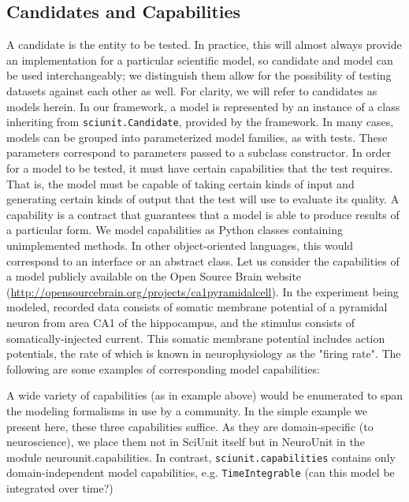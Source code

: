 \documentclass[a4paper,12pt]{article}
\begin{document}
\subsection{Candidates and Capabilities}
A candidate is the entity to be tested.  In practice, this will almost always provide an implementation for a particular scientific model, so candidate and model can be used interchangeably; we distinguish them allow for the possibility of testing datasets against each other as well.  For clarity, we will refer to candidates as models herein.  In our framework, a model is represented by an instance of a class inheriting from \verb|sciunit.Candidate|, provided by the framework.  In many cases, models can be grouped into parameterized model families, as with tests. These parameters correspond to parameters passed to a subclass constructor.
In order for a model to be tested, it must have certain capabilities that the test requires.  That is, the model must be capable of taking certain kinds of input and generating certain kinds of output that the test will use to evaluate its quality.  A capability is a contract that guarantees that a model is able to produce results of a particular form. We model capabilities as Python classes containing unimplemented methods. In other object-oriented languages, this would correspond to an interface or an abstract class.  
Let us consider the capabilities of a model publicly available on the Open Source Brain website (\url{http://opensourcebrain.org/projects/ca1pyramidalcell}).  In the experiment being modeled, recorded data consists of somatic membrane potential of a pyramidal neuron from area CA1 of the hippocampus, and the stimulus consists of somatically-injected current.  This somatic membrane potential includes action potentials, the rate of which is known in neurophysiology as the "firing rate".  The following are some examples of corresponding model capabilities:  

A wide variety of capabilities (as in example above) would be enumerated to span the modeling formalisms in use by a community. In the simple example we present here, these three capabilities suffice.  As they are domain-specific (to neuroscience), we place them not in SciUnit itself but in NeuroUnit in the module neurounit.capabilities.  In contrast, \verb|sciunit.capabilities| contains only domain-independent model capabilities, e.g. \verb|TimeIntegrable| (can this model be integrated over time?)
\end{document}
